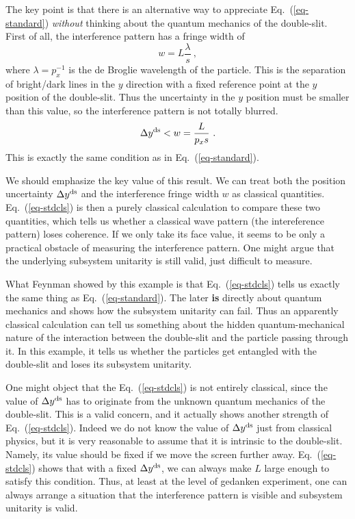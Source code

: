 \documentclass[aps,showpacs,onecolumn,floats,prd,superscriptaddress,nofootinbib]{revtex4-1}
\begin{document}
The key point is that there is an alternative way to appreciate Eq.~(\ref{eq-standard}) {\it without} thinking about the quantum mechanics of the double-slit. 
First of all, the interference pattern has a fringe width of  
\begin{equation}
w = L\frac{\lambda}{s}~,
\end{equation}
where $\lambda = p_x^{-1}$ is the de Broglie wavelength of the particle. 
This is the separation of bright/dark lines in the $y$ direction with a fixed reference point at the $y$ position of the double-slit. 
Thus the uncertainty in the $y$ position must be smaller than this value, so the interference pattern is not totally blurred.
\begin{equation}
\Delta y^{\rm ds} < w = \frac{L}{p_xs}~.
\label{eq-stdcls}
\end{equation}
This is exactly the same condition as in Eq.~(\ref{eq-standard}).

We should emphasize the key value of this result. 
We can treat both the position uncertainty $\Delta y^{\rm ds}$ and the interference fringe width $w$ as classical quantities. Eq.~(\ref{eq-stdcls}) is then a purely classical calculation to compare these two quantities, which tells us whether a classical wave pattern (the intereference pattern) loses coherence. 
If we only take its face value, it seems to be only a practical obstacle of measuring the interference pattern. 
One might argue that the underlying subsystem unitarity is still valid, just difficult to measure. 

What Feynman showed by this example is that Eq.~(\ref{eq-stdcls}) tells us exactly the same thing as Eq.~(\ref{eq-standard}). 
The later {\bf is} directly about quantum mechanics and shows how the subsystem unitarity can fail. 
Thus an apparently classical calculation can tell us something about the hidden quantum-mechanical nature of the interaction between the double-slit and the particle passing through it. 
In this example, it tells us whether the particles get entangled with the double-slit and loses its subsystem unitarity. 

One might object that the Eq.~(\ref{eq-stdcls}) is not entirely classical, since the value of $\Delta y^{\rm ds}$ has to originate from the unknown quantum mechanics of the double-slit. 
This is a valid concern, and it actually shows another strength of Eq.~(\ref{eq-stdcls}). 
Indeed we do not know the value of $\Delta y^{\rm ds}$ just from classical physics, but it is very reasonable to assume that it is intrinsic to the double-slit. 
Namely, its value should be fixed if we move the screen further away. Eq.~(\ref{eq-stdcls}) shows that with a fixed $\Delta y^{\rm ds}$, we can always make $L$ large enough to satisfy this condition. 
Thus, at least at the level of gedanken experiment, one can always arrange a situation that the interference pattern is visible and subsystem unitarity is valid.
\end{document}

